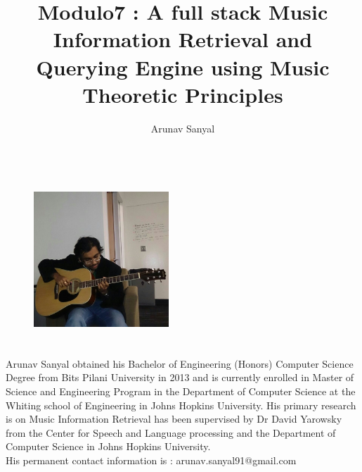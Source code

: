\documentclass[12pt,oneside,final]{thesis}
\begin{document}
\title{Modulo7 : A full stack Music Information Retrieval and Querying Engine using Music Theoretic Principles}
\author{Arunav Sanyal}
\essay
\masterscience
\copyrightnotice

















\begin{vita}

\begin{figure}
\includegraphics[width=2in,height=2.5in,clip,keepaspectratio]{ArunavSanyal.jpg}
\end{figure}

\noindent Arunav Sanyal obtained his Bachelor of Engineering (Honors) Computer Science Degree from Bits Pilani University in 2013 and is currently enrolled in Master of Science and Engineering Program in the Department of Computer Science at the Whiting school of Engineering in Johns Hopkins University. His primary research is on Music Information Retrieval has been supervised by Dr David Yarowsky from the Center for Speech and Language processing and the Department of Computer Science in Johns Hopkins University. \\

\noindent His permanent contact information is : arunav.sanyal91@gmail.com

\end{vita}
\end{document}
